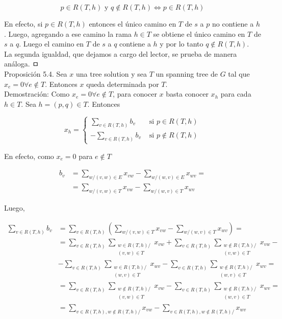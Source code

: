 \documentclass[10pt]{article}
\begin{document}
$$
p \in R(T, h) \text { y } q \notin R(T, h) \Longleftrightarrow p \in R(T, h)
$$

En efecto, si $p \in R(T, h)$ entonces el único camino en $T$ de $s$ a $p$ no contiene a $h$. Luego, agregando a ese camino la rama $h \in T$ se obtiene el único camino en $T$ de $s$ a $q$. Luego el camino en $T$ de $s$ a $q$ contiene a $h$ y por lo tanto $q \notin R(T, h)$.\\
La segunda igualdad, que dejamos a cargo del lector, se prueba de manera análoga. ㅁ\\
Proposición 5.4. Sea $x$ una tree solution y sea $T$ un spanning tree de $G$ tal que $x_{e}=0 \forall e \notin T$. Entonces $x$ queda determinada por $T$.\\
Demostración: Como $x_{e}=0 \forall e \notin T$, para conocer $x$ basta conocer $x_{h}$ para cada $h \in T$. Sea $h=(p, q) \in T$. Entonces

$$
x_{h}= \begin{cases}\sum_{v \in R(T, h)} b_{v} & \text { si } p \in R(T, h) \\ -\sum_{v \in R(T, h)} b_{v} & \text { si } p \notin R(T, h)\end{cases}
$$

En efecto, como $x_{e}=0$ para $e \notin T$

$$
\begin{aligned}
b_{v} & =\sum_{w /(v, w) \in E} x_{v w}-\sum_{w /(w, v) \in E} x_{w v}= \\
& =\sum_{w /(v, w) \in T} x_{v w}-\sum_{w /(w, v) \in T} x_{w v}
\end{aligned}
$$

Luego,

$$
\begin{aligned}
\sum_{v \in R(T, h)} b_{v} & =\sum_{v \in R(T, h)}\left(\sum_{w /(v, w) \in T} x_{v w}-\sum_{w /(w, v) \in T} x_{w v}\right)= \\
& =\sum_{v \in R(T, h)} \sum_{\substack{w \in R(T, h) / \\
(v, w) \in T}} x_{v w}+\sum_{v \in R(T, h)} \sum_{\substack{w \notin R(T, h) / \\
(v, w) \in T}} x_{v w}- \\
& -\sum_{v \in R(T, h)} \sum_{\substack{w \in R(T, h) / \\
(w, v) \in T}} x_{w v}-\sum_{v \in R(T, h)} \sum_{\substack{w \notin R(T, h) / \\
(w, v) \in T}} x_{w v}= \\
& =\sum_{v \in R(T, h)} \sum_{\substack{w \notin R(T, h) / \\
(v, w) \in T}} x_{v w}-\sum_{v \in R(T, h)} \sum_{\substack{w \notin R(T, h) / \\
(w, v) \in T}} x_{w v}= \\
& =\sum_{v \in R(T, h), w \notin R(T, h) /} x_{v w}-\sum_{v \in R(T, h), w \notin R(T, h) /} x_{w v}
\end{aligned}
$$
\end{document}
